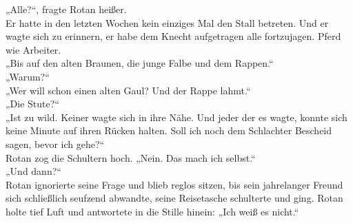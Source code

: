 „Alle?“, fragte Rotan heißer.\\
Er hatte in den letzten Wochen kein einziges Mal den Stall betreten. Und er wagte sich zu erinnern, 
er habe dem Knecht aufgetragen alle fortzujagen. Pferd wie Arbeiter.\\
„Bis auf den alten Braunen, die junge Falbe und dem Rappen.“\\
„Warum?“\\
„Wer will schon einen alten Gaul? Und der Rappe lahmt.“\\
„Die Stute?“\\
„Ist zu wild. Keiner wagte sich in ihre Nähe. Und jeder der es wagte, konnte sich keine Minute auf 
ihren Rücken halten. Soll ich noch dem Schlachter Bescheid sagen, bevor ich gehe?“\\
Rotan zog die Schultern hoch. „Nein. Das mach ich selbst.“\\
„Und dann?“\\
Rotan ignorierte seine Frage und blieb reglos sitzen, bis sein jahrelanger Freund sich schließlich 
seufzend abwandte, seine Reisetasche schulterte und ging. Rotan holte tief Luft und antwortete in 
die Stille hinein: „Ich weiß es nicht.“\\

